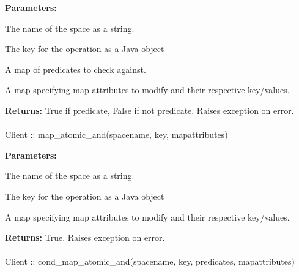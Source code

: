 \noindent\textbf{Parameters:}
\begin{description}[labelindent=\widthof{{\code{mapattributes}}},leftmargin=*,noitemsep,nolistsep,align=right]
\item[\code{spacename}] The name of the space as a string.
\item[\code{key}] The key for the operation as a Java object
\item[\code{predicates}] A map of predicates to check against.
\item[\code{mapattributes}] A map specifying map attributes to modify and their respective key/values.
\end{description}

\noindent\textbf{Returns:}
True if predicate, False if not predicate.  Raises exception on error.

\paragraph{}
\label{api:java:map_atomic_and}
\begin{javacode}
Client :: map_atomic_and(spacename, key, mapattributes)
\end{javacode}
\funcdesc 

\noindent\textbf{Parameters:}
\begin{description}[labelindent=\widthof{{\code{mapattributes}}},leftmargin=*,noitemsep,nolistsep,align=right]
\item[\code{spacename}] The name of the space as a string.
\item[\code{key}] The key for the operation as a Java object
\item[\code{mapattributes}] A map specifying map attributes to modify and their respective key/values.
\end{description}

\noindent\textbf{Returns:}
True.  Raises exception on error.

\paragraph{}
\label{api:java:cond_map_atomic_and}
\begin{javacode}
Client :: cond_map_atomic_and(spacename, key, predicates, mapattributes)
\end{javacode}
\funcdesc 

